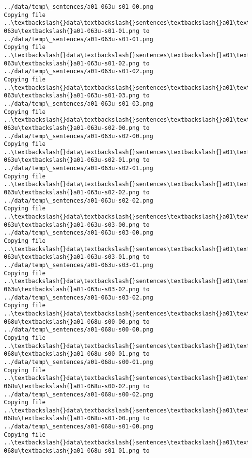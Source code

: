 \documentclass[11pt]{article}
\begin{document}
\begin{Verbatim}[commandchars=\\\{\}]
../data/temp\_sentences/a01-063u-s01-00.png
Copying file ..\textbackslash{}data\textbackslash{}sentences\textbackslash{}a01\textbackslash{}a01-063u\textbackslash{}a01-063u-s01-01.png to
../data/temp\_sentences/a01-063u-s01-01.png
Copying file ..\textbackslash{}data\textbackslash{}sentences\textbackslash{}a01\textbackslash{}a01-063u\textbackslash{}a01-063u-s01-02.png to
../data/temp\_sentences/a01-063u-s01-02.png
Copying file ..\textbackslash{}data\textbackslash{}sentences\textbackslash{}a01\textbackslash{}a01-063u\textbackslash{}a01-063u-s01-03.png to
../data/temp\_sentences/a01-063u-s01-03.png
Copying file ..\textbackslash{}data\textbackslash{}sentences\textbackslash{}a01\textbackslash{}a01-063u\textbackslash{}a01-063u-s02-00.png to
../data/temp\_sentences/a01-063u-s02-00.png
Copying file ..\textbackslash{}data\textbackslash{}sentences\textbackslash{}a01\textbackslash{}a01-063u\textbackslash{}a01-063u-s02-01.png to
../data/temp\_sentences/a01-063u-s02-01.png
Copying file ..\textbackslash{}data\textbackslash{}sentences\textbackslash{}a01\textbackslash{}a01-063u\textbackslash{}a01-063u-s02-02.png to
../data/temp\_sentences/a01-063u-s02-02.png
Copying file ..\textbackslash{}data\textbackslash{}sentences\textbackslash{}a01\textbackslash{}a01-063u\textbackslash{}a01-063u-s03-00.png to
../data/temp\_sentences/a01-063u-s03-00.png
Copying file ..\textbackslash{}data\textbackslash{}sentences\textbackslash{}a01\textbackslash{}a01-063u\textbackslash{}a01-063u-s03-01.png to
../data/temp\_sentences/a01-063u-s03-01.png
Copying file ..\textbackslash{}data\textbackslash{}sentences\textbackslash{}a01\textbackslash{}a01-063u\textbackslash{}a01-063u-s03-02.png to
../data/temp\_sentences/a01-063u-s03-02.png
Copying file ..\textbackslash{}data\textbackslash{}sentences\textbackslash{}a01\textbackslash{}a01-068u\textbackslash{}a01-068u-s00-00.png to
../data/temp\_sentences/a01-068u-s00-00.png
Copying file ..\textbackslash{}data\textbackslash{}sentences\textbackslash{}a01\textbackslash{}a01-068u\textbackslash{}a01-068u-s00-01.png to
../data/temp\_sentences/a01-068u-s00-01.png
Copying file ..\textbackslash{}data\textbackslash{}sentences\textbackslash{}a01\textbackslash{}a01-068u\textbackslash{}a01-068u-s00-02.png to
../data/temp\_sentences/a01-068u-s00-02.png
Copying file ..\textbackslash{}data\textbackslash{}sentences\textbackslash{}a01\textbackslash{}a01-068u\textbackslash{}a01-068u-s01-00.png to
../data/temp\_sentences/a01-068u-s01-00.png
Copying file ..\textbackslash{}data\textbackslash{}sentences\textbackslash{}a01\textbackslash{}a01-068u\textbackslash{}a01-068u-s01-01.png to

\end{Verbatim}
\end{document}
